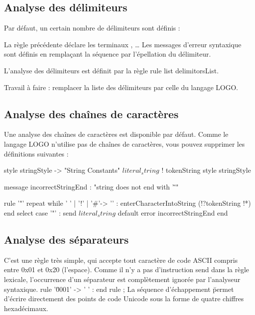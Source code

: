 \subsection{Analyse des délimiteurs}
Par défaut, un certain nombre de délimiteurs sont définis :


La règle précédente déclare les terminaux \galgas{\$:\$}, \galgas{\$,\$}… Les messages d'erreur syntaxique sont définis en remplaçant la séquence  par l’épellation du délimiteur.

L'analyse des délimiteurs est définit par la règle rule list delimitorsList.

Travail à faire : remplacer la liste des délimiteurs par celle du langage LOGO.

\subsection{Analyse des chaînes de caractères}
Une analyse des chaînes de caractères est disponible par défaut. Comme le langage LOGO n’utilise pas de chaînes de caractères, vous pouvez supprimer les définitions suivantes :

\begin{galgascode}
style stringStyle -> "String Constants"
$literal_string$ ! tokenString style stringStyle %

message incorrectStringEnd : "string does not end with '\"'"

rule '"' {
  repeat
  while ' ' | '!' | '#'-> '\uFFFD' :
    enterCharacterIntoString (!?tokenString !*)
  end
  select
  case '"' :
    send $literal_string$
  default
    error incorrectStringEnd
  end
}
\end{galgascode}

\subsection{Analyse des séparateurs}
C'est une règle très simple, qui accepte tout caractère de code ASCII compris entre 0x01 et 0x20 (l'espace). Comme il n'y a pas d'instruction send dans la règle lexicale, l'occurrence d'un séparateur est complètement ignorée par l'analyseur syntaxique.
rule '\u0001' -> ' ' :
end rule ;
La séquence d'échappement \u permet d'écrire directement des points de code Unicode sous la forme de quatre chiffres hexadécimaux.

